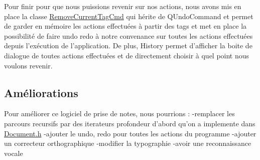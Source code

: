 Pour finir pour que nous puissions revenir sur nos actions, nous avons mis en place la classe \hyperlink{class_remove_current_tag_cmd}{Remove\-Current\-Tag\-Cmd} qui hérite de Q\-Undo\-Command et permet de garder en mémoire les actions effectuées à partir des tags et met en place la possibilité de faire undo redo à notre convenance sur toutes les actions effectuées depuis l'exécution de l'application. De plus, History permet d'afficher la boite de dialogue de toutes actions effectuées et de directement choisir à quel point nous voulons revenir.\hypertarget{index_Améliorations}{}\subsection{Améliorations}\label{index_Améliorations}
Pour améliorer ce logiciel de prise de notes, nous pourrions \-: -\/remplacer les parcours recursifs par des iterateurs profondeur d'abord qu'on a implemente dans \hyperlink{_document_8h}{Document.\-h} -\/ajouter le undo, redo pour toutes les actions du programme -\/ajouter un correcteur orthographique -\/modifier la typographie -\/avoir une reconnaissance vocale 